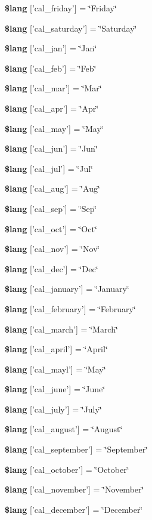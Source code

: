 \begin{DoxyCompactItemize}
\item 
{\bf \$lang} ['cal\-\_\-friday'] = \char`\"{}Friday\char`\"{}
\item 
{\bf \$lang} ['cal\-\_\-saturday'] = \char`\"{}Saturday\char`\"{}
\item 
{\bf \$lang} ['cal\-\_\-jan'] = \char`\"{}Jan\char`\"{}
\item 
{\bf \$lang} ['cal\-\_\-feb'] = \char`\"{}Feb\char`\"{}
\item 
{\bf \$lang} ['cal\-\_\-mar'] = \char`\"{}Mar\char`\"{}
\item 
{\bf \$lang} ['cal\-\_\-apr'] = \char`\"{}Apr\char`\"{}
\item 
{\bf \$lang} ['cal\-\_\-may'] = \char`\"{}May\char`\"{}
\item 
{\bf \$lang} ['cal\-\_\-jun'] = \char`\"{}Jun\char`\"{}
\item 
{\bf \$lang} ['cal\-\_\-jul'] = \char`\"{}Jul\char`\"{}
\item 
{\bf \$lang} ['cal\-\_\-aug'] = \char`\"{}Aug\char`\"{}
\item 
{\bf \$lang} ['cal\-\_\-sep'] = \char`\"{}Sep\char`\"{}
\item 
{\bf \$lang} ['cal\-\_\-oct'] = \char`\"{}Oct\char`\"{}
\item 
{\bf \$lang} ['cal\-\_\-nov'] = \char`\"{}Nov\char`\"{}
\item 
{\bf \$lang} ['cal\-\_\-dec'] = \char`\"{}Dec\char`\"{}
\item 
{\bf \$lang} ['cal\-\_\-january'] = \char`\"{}January\char`\"{}
\item 
{\bf \$lang} ['cal\-\_\-february'] = \char`\"{}February\char`\"{}
\item 
{\bf \$lang} ['cal\-\_\-march'] = \char`\"{}March\char`\"{}
\item 
{\bf \$lang} ['cal\-\_\-april'] = \char`\"{}April\char`\"{}
\item 
{\bf \$lang} ['cal\-\_\-mayl'] = \char`\"{}May\char`\"{}
\item 
{\bf \$lang} ['cal\-\_\-june'] = \char`\"{}June\char`\"{}
\item 
{\bf \$lang} ['cal\-\_\-july'] = \char`\"{}July\char`\"{}
\item 
{\bf \$lang} ['cal\-\_\-august'] = \char`\"{}August\char`\"{}
\item 
{\bf \$lang} ['cal\-\_\-september'] = \char`\"{}September\char`\"{}
\item 
{\bf \$lang} ['cal\-\_\-october'] = \char`\"{}October\char`\"{}
\item 
{\bf \$lang} ['cal\-\_\-november'] = \char`\"{}November\char`\"{}
\item 
{\bf \$lang} ['cal\-\_\-december'] = \char`\"{}December\char`\"{}
\end{DoxyCompactItemize}


